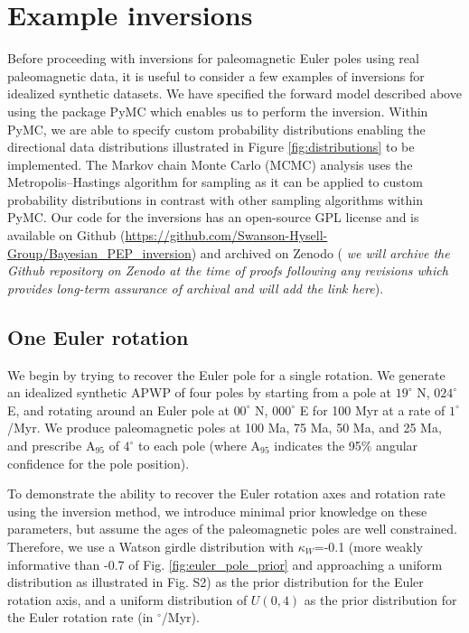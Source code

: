 \documentclass[]{agujournal2019}
\begin{document}
\section*{Example inversions}
\label{sec:example_inversion}

Before proceeding with inversions for paleomagnetic Euler poles using real paleomagnetic data, it is useful to consider a few examples of inversions for idealized synthetic datasets. We have specified the forward model described above using the package PyMC \cite{Salvatier2016a} which enables us to perform the inversion. Within PyMC, we are able to specify custom probability distributions enabling the directional data distributions illustrated in Figure \ref{fig:distributions} to be implemented. The Markov chain Monte Carlo (MCMC) analysis uses the Metropolis–Hastings algorithm for sampling as it can be applied to custom probability distributions in contrast with other sampling algorithms within PyMC. Our code for the inversions has an open-source GPL license and is available on Github (\url{https://github.com/Swanson-Hysell-Group/Bayesian_PEP_inversion}) and archived on Zenodo ( \textit{we will archive the Github repository on Zenodo at the time of proofs following any revisions which provides long-term assurance of archival and will add the link here}).

\subsection*{One Euler rotation}
\label{sec:one_stage_pole}
We begin by trying to recover the Euler pole for a single rotation. We generate an idealized synthetic APWP of four poles by starting from a pole at $19^\circ$ N, $024^\circ$ E, and rotating around an Euler pole at $00^\circ$ N, $000^\circ$ E for 100 Myr at a rate of $1^\circ$/Myr. We produce paleomagnetic poles at 100 Ma, 75 Ma, 50 Ma, and 25 Ma, and prescribe A$_{95}$ of $4^\circ$ to each pole (where A$_{95}$ indicates the 95\% angular confidence for the pole position).

To demonstrate the ability to recover the Euler rotation axes and rotation rate using the inversion method, we introduce minimal prior knowledge on these parameters, but assume the ages of the paleomagnetic poles are well constrained. Therefore, we use a Watson girdle distribution with $\kappa_W$=-0.1 (more weakly informative than -0.7 of Fig. \ref{fig:euler_pole_prior} and approaching a uniform distribution as illustrated in Fig. S2) as the prior distribution for the Euler rotation axis, and a uniform distribution of $U(0, 4)$ as the prior distribution for the Euler rotation rate (in $^\circ$/Myr). 
\end{document}
